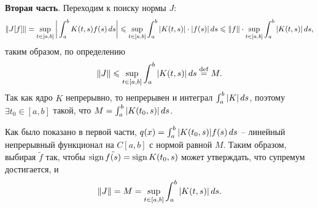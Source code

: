 \textbf{Вторая часть}. Переходим к поиску нормы $J$:
\begin{align*}
    \|J[f]\| = \sup_{t\in[a, b]} \bigg| 
        \int_{a}^{b} K(t, s) f(s) \, d s
    \bigg| \leqslant \sup_{t\in[a, b]} \int_{a}^{b}  |K(t, s)| \cdot |f(s)| \, d s \leqslant 
    \|f\| \cdot \sup_{t\in[a, b]} \int_{a}^{b} |K(t, s)| \, d s,
\end{align*}
таким образом, по определению
\begin{equation*}
    \|J\| \leqslant \sup_{t\in[a, b]} \int_{a}^{b} |K(t, s)| \, d s \overset{\mathrm{def}}{=}  M.
\end{equation*}
Так как ядро $K$ непрерывно, то непрерывен и интеграл $\int_a^b |K|\, d s$, поэтому $\exists t_0 \in [a, b]$ такой, что $M = \int_{a}^{b} |K(t_0, s)|\, d s$. 

Как было показано в первой части, $q(x) = \int_{a}^{b}  |K(t_0, s)| f(s) \, d s$ -- линейный непрерывный функционал на $C[a, b]$ с нормой равной $M$. Таким образом, выбирая $\tilde{f}$ так, чтобы $\mathop{\mathrm{sign}}\nolimits \tilde{f(s)} = \mathop{\mathrm{sign}}\nolimits K(t_0, s)$ может утверждать, что супремум достигается, и 
\begin{equation*}
    \|J\| = M = \sup_{t\in[a, b]} \int_{a}^{b}  |K(t, s)| \, d s.
\end{equation*}

